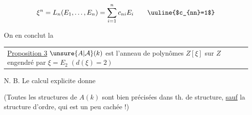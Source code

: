 
\[\xi^n=L_n(E_1,\ldots,E_n)=\sum_{i=1}^{n}c_{ni}E_i\qquad\text{\uuline{$c_{nn}=1$}}\]

On en conclut la

\noindent\begin{tabular}{@{}|p{.92\linewidth}@{}}\uline{Proposition 3} $\unsure{A|\mathcal A}(k)$ est l'anneau de polynômes $Z[\xi]$ sur $Z$ engendré par $\xi=E_2$ $(d(\xi)=2)$\end{tabular}

N. B. Le calcul explicite donne


(Toutes les structures de $A(k)$ sont bien précisées dans  th. de structure, \uline{sauf} la structure d'ordre, qui est un peu cachée !)

